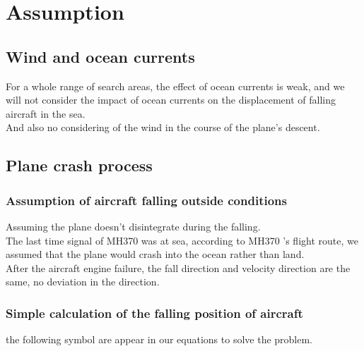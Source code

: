 \documentclass[11pt]{article}
\begin{document}
\tableofcontents
\hypertarget{Assumption}{%
\section{Assumption}\label{Assumption}}
\hypertarget{Wind and ocean currents}{%
\subsection{Wind and ocean currents}\label{Wind and ocean currents}}
For a whole range of search areas, the effect of ocean currents is weak, and we will not consider the impact of ocean currents on the displacement of falling aircraft in the sea.\\
And also no considering of the wind in the course of the plane's descent.\\
\hypertarget{Plane crash process}{%
\subsection{Plane crash process}\label{Plane crash process}}
\hypertarget{Assumption of aircraft falling outside conditions}{%
\subsubsection{Assumption of aircraft falling outside conditions}\label{Assumption of aircraft falling outside conditions}}
Assuming the plane doesn't disintegrate during the falling.\\
    The last time signal of MH370 was at sea, according to MH370 's flight route, we assumed that the plane would crash into the ocean rather than land.\\
    After the aircraft engine failure, the fall direction and velocity direction are the same, no deviation in the direction.\\
\hypertarget{Simple calculation of the falling position of aircraft}{%
\subsubsection{Simple calculation of the falling position of aircraft}\label{Simple calculation of the falling position of aircraft}}
the following symbol are appear in our equations to solve the problem.\\
\end{document}
